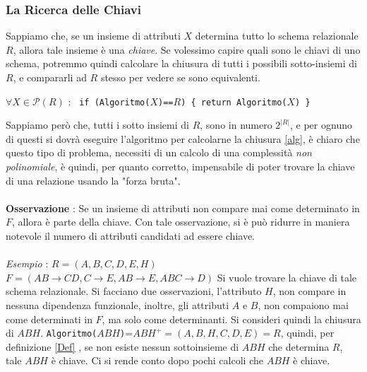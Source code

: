 \documentclass[12pt, letterpaper]{article}
\newcommand{\codee}[1]{\colorbox{white}{\texttt{#1}}}
\newcommand{\acc}{\\\hphantom{}\\}
\newcommand{\dete}{{\rightarrow}}
\begin{document}
\subsubsection{La Ricerca delle Chiavi}
Sappiamo che, se un insieme di attributi \(X\) determina tutto lo schema relazionale \(R\), allora tale insieme 
è una \textit{chiave}. Se volessimo capire quali sono le chiavi di uno schema, potremmo quindi calcolare la chiusura di tutti 
i possibili sotto-insiemi di \(R\), e compararli ad \(R\) stesso per vedere se sono equivalenti.\begin{center}
    \(\forall X\in \mathcal{P}(R)\) : \codee{ if (Algoritmo(}\(X\)\codee{)==}\(R\)\codee{) \{ return Algoritmo(}\(X\)\codee{) \}} 
\end{center} Sappiamo però che, tutti i 
sotto insiemi di \(R\), sono in numero \(2^{|R|}\), e per ognuno di questi si dovrà eseguire l'algoritmo per calcolarne 
la chiusura \ref{alg}, è chiaro che questo tipo di problema, necessiti di un calcolo di una complessità \textit{non polinomiale}, 
è quindi, per quanto corretto, impensabile di poter trovare la chiave di una relazione usando la "forza bruta".
\acc\textbf{Osservazione} : Se un insieme di attributi non compare mai come determinato in \(F\), allora è parte della chiave. 
Con tale osservazione, si è può ridurre in maniera notevole il numero di attributi candidati ad essere chiave. \acc
\textit{Esempio} : \(R=(A,B,C,D,E,H)\)\hphantom{  } \(F=(AB\dete CD,C\dete E,AB\dete E,ABC\dete D)\) Si vuole trovare la chiave 
di tale schema relazionale. Si facciano due osservazioni, l'attributo \(H\), non compare in nessuna dipendenza funzionale, 
inoltre, gli attributi \(A\) e \(B\), non compaiono mai come determinati in \(F\), ma solo come determinanti. Si consideri quindi 
la chiusura di \(ABH\). \codee{Algoritmo(}\(ABH\)\codee{)}=\(ABH^+=(A,B,H,C,D,E)=R\), quindi, per definizione \ref{Def} , se non esiste 
nessun sottoinsieme di \(ABH\) che determina \(R\), tale \(ABH\) è chiave. Ci si rende conto dopo pochi calcoli che \(ABH\) è chiave.\acc
\end{document}
